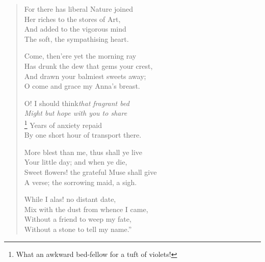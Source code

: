 \begin{verse}
  \begin{altverse}
    For there has liberal Nature joined \\
    Her riches to the stores of Art, \\
    And added to the vigorous mind \\
    The soft, the sympathising heart.
  \end{altverse}

  \begin{altverse}
    Come, then\textemdash 'ere yet the morning ray \\
    Has drunk the dew that gems your crest, \\
    And drawn your balmiest sweets away; \\
    O come and grace my Anna's breast.
  \end{altverse}

  \begin{altverse}
    O! I should think\textemdash \emph{that fragrant
      bed} \\
    \emph{Might but hope with you to share}\textemdash\\
\footnote{What an awkward bed-fellow for a tuft of violets!}
    Years of anxiety repaid \\
    By one short hour of transport there.
  \end{altverse}

  \begin{altverse}
    More blest than me, thus shall ye live \\
    Your little day; and when ye die, \\
    Sweet flowers! the grateful Muse shall give \\
    A verse; the sorrowing maid, a sigh.
  \end{altverse}

  \begin{altverse}
    While I alas! no distant date, \\
    Mix with the dust from whence I came, \\
    Without a friend to weep my fate, \\
    Without a stone to tell my name.''
  \end{altverse}
\end{verse}

\renewcommand*{\footnoterule}{%
\centering \rule[0.25\baselineskip]{\textwidth}{0.65pt}
}


